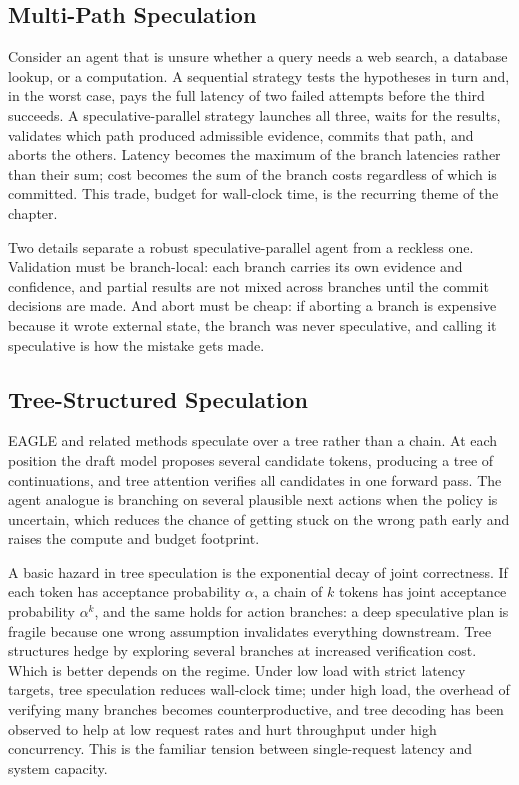 \documentclass[11pt]{book}
\begin{document}
\subsection{Multi-Path Speculation}

Consider an agent that is unsure whether a query needs a web search, a database lookup, or a computation. A sequential strategy tests the hypotheses in turn and, in the worst case, pays the full latency of two failed attempts before the third succeeds. A speculative-parallel strategy launches all three, waits for the results, validates which path produced admissible evidence, commits that path, and aborts the others. Latency becomes the maximum of the branch latencies rather than their sum; cost becomes the sum of the branch costs regardless of which is committed. This trade, budget for wall-clock time, is the recurring theme of the chapter.

Two details separate a robust speculative-parallel agent from a reckless one. Validation must be branch-local: each branch carries its own evidence and confidence, and partial results are not mixed across branches until the commit decisions are made. And abort must be cheap: if aborting a branch is expensive because it wrote external state, the branch was never speculative, and calling it speculative is how the mistake gets made.

\subsection{Tree-Structured Speculation}

EAGLE and related methods speculate over a tree rather than a chain. At each position the draft model proposes several candidate tokens, producing a tree of continuations, and tree attention verifies all candidates in one forward pass. The agent analogue is branching on several plausible next actions when the policy is uncertain, which reduces the chance of getting stuck on the wrong path early and raises the compute and budget footprint.

A basic hazard in tree speculation is the exponential decay of joint correctness. If each token has acceptance probability $\alpha$, a chain of $k$ tokens has joint acceptance probability $\alpha^k$, and the same holds for action branches: a deep speculative plan is fragile because one wrong assumption invalidates everything downstream. Tree structures hedge by exploring several branches at increased verification cost. Which is better depends on the regime. Under low load with strict latency targets, tree speculation reduces wall-clock time; under high load, the overhead of verifying many branches becomes counterproductive, and tree decoding has been observed to help at low request rates and hurt throughput under high concurrency. This is the familiar tension between single-request latency and system capacity.
\end{document}
